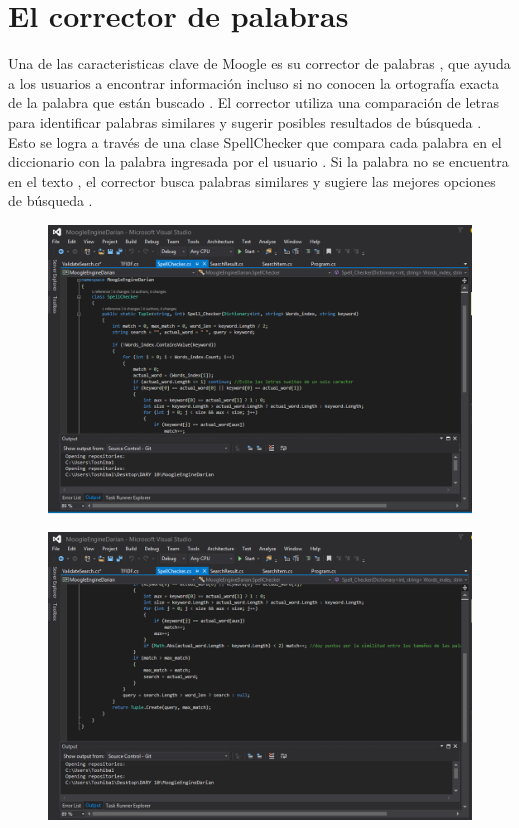 \documentclass[12pt,a4paper]{article}
\begin{document}
\section{El corrector de palabras}
Una de las caracteristicas clave de Moogle es su corrector de palabras , que ayuda a los usuarios a encontrar información incluso si no conocen la ortografía exacta de la palabra que están buscado . El corrector utiliza una comparación de letras para identificar palabras similares y sugerir posibles resultados de búsqueda . Esto se logra a través de una clase SpellChecker que compara cada palabra en el diccionario con la palabra ingresada por el usuario . Si la palabra no se encuentra en el texto , el corrector busca palabras similares y sugiere las mejores opciones de búsqueda . 
\begin{figure}[H]
\centering
\includegraphics[scale=0.5]{SpellChecker1}
\end{figure}
\begin{figure}[H]
\centering
\includegraphics[scale=0.5]{SpellChecker2}
\end{figure}
\end{document}
